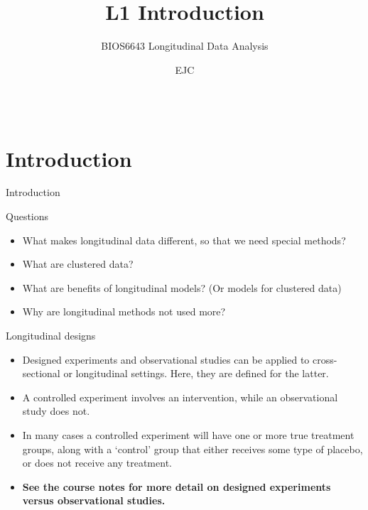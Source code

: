 \documentclass[
  9pt,
  ignorenonframetext,
]{beamer}
\title{L1 Introduction}
\subtitle{BIOS6643 Longitudinal Data Analysis}
\author{EJC}
\date{}
\institute{Department of Biostatistics \& Informatics}
\providecommand{\tightlist}{%
  \setlength{\itemsep}{0pt}\setlength{\parskip}{0pt}}
\begin{document}
\frame{\titlepage}

\begin{frame}
  \begin{columns}
  \column{10cm}
  \tableofcontents
  \end{columns}
\end{frame}
\hypertarget{introduction}{%
\section{Introduction}\label{introduction}}

\begin{frame}{Introduction}
\vspace{\baselineskip}

\begin{block}{Questions}
\protect\hypertarget{questions}{}
\begin{itemize}
\tightlist
\item
  What makes longitudinal data different, so that we need special
  methods?
\item
  What are clustered data?
\item
  What are benefits of longitudinal models? (Or models for clustered
  data)
\item
  Why are longitudinal methods not used more?
\end{itemize}
\end{block}
\end{frame}

\begin{frame}{Longitudinal designs}
\protect\hypertarget{longitudinal-designs}{}
\begin{itemize}
\tightlist
\item
  Designed experiments and observational studies can be applied to
  cross-sectional or longitudinal settings. Here, they are defined for
  the latter.
\item
  A controlled experiment involves an intervention, while an
  observational study does not.
\item
  In many cases a controlled experiment will have one or more true
  treatment groups, along with a `control' group that either receives
  some type of placebo, or does not receive any treatment.
\item
  \textbf{See the course notes for more detail on designed experiments
  versus observational studies.}
\end{itemize}
\end{frame}
\end{document}
